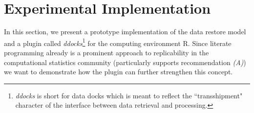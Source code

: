 \documentclass{acm_proc_article-sp}
\begin{document}




























\section{Experimental Implementation}\label{sec:impl}

In this section, we present a prototype implementation of the data restore model and a plugin called \textit{ddocks}\footnote{\textit{ddocks} is short for data docks which is meant to reflect the ``transshipment" character of the interface between data retrieval and processing.} 
for the computing environment R.
Since literate programming already is a prominent approach to replicability in the computational statistics community \cite{leisch2011executable} (particularly supports recommendation \textit{(A)}) we want to demonstrate how the plugin can further strengthen this concept.
\end{document}
